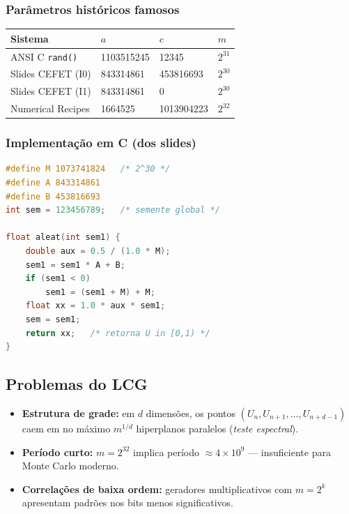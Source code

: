 \documentclass[12pt,a4paper]{article}
\begin{document}
\subsubsection*{Par\^ametros hist\'oricos famosos}

\begin{center}
\begin{tabular}{llll}
\toprule
Sistema & $a$ & $c$ & $m$ \\
\midrule
ANSI C \texttt{rand()} & 1103515245 & 12345 & $2^{31}$ \\
Slides CEFET (I0) & 843314861 & 453816693 & $2^{30}$ \\
Slides CEFET (I1) & 843314861 & 0 & $2^{30}$ \\
Numerical Recipes & 1664525 & 1013904223 & $2^{32}$ \\
\bottomrule
\end{tabular}
\end{center}

\subsubsection*{Implementa\c{c}\~ao em C (dos slides)}

\begin{lstlisting}[language=C, basicstyle=\ttfamily\small]
#define M 1073741824   /* 2^30 */
#define A 843314861
#define B 453816693
int sem = 123456789;   /* semente global */

float aleat(int sem1) {
    double aux = 0.5 / (1.0 * M);
    sem1 = sem1 * A + B;
    if (sem1 < 0)
        sem1 = (sem1 + M) + M;
    float xx = 1.0 * aux * sem1;
    sem = sem1;
    return xx;   /* retorna U in [0,1) */
}
\end{lstlisting}

\subsection{Problemas do LCG}

\begin{itemize}
  \item \textbf{Estrutura de grade:} em $d$ dimens\~oes, os pontos $(U_n, U_{n+1}, \ldots, U_{n+d-1})$ caem em no m\'aximo $m^{1/d}$ hiperplanos paralelos (\emph{teste espectral}).
  \item \textbf{Per\'iodo curto:} $m=2^{32}$ implica per\'iodo $\approx 4\times10^9$ --- insuficiente para Monte Carlo moderno.
  \item \textbf{Correla\c{c}\~oes de baixa ordem:} geradores multiplicativos com $m=2^k$ apresentam padr\~oes nos bits menos significativos.
\end{itemize}
\end{document}
